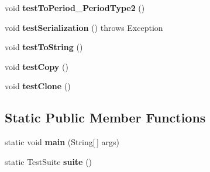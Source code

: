 \begin{DoxyCompactItemize}
\item 
\hypertarget{classorg_1_1joda_1_1time_1_1_test_mutable_interval___basics_a452c1665aa56bf78d9020b5d9f0861b3}{void {\bfseries test\-To\-Period\-\_\-\-Period\-Type2} ()}\label{classorg_1_1joda_1_1time_1_1_test_mutable_interval___basics_a452c1665aa56bf78d9020b5d9f0861b3}

\item 
\hypertarget{classorg_1_1joda_1_1time_1_1_test_mutable_interval___basics_a710d9afc2ab1d972f84e3218f547a4e1}{void {\bfseries test\-Serialization} ()  throws Exception }\label{classorg_1_1joda_1_1time_1_1_test_mutable_interval___basics_a710d9afc2ab1d972f84e3218f547a4e1}

\item 
\hypertarget{classorg_1_1joda_1_1time_1_1_test_mutable_interval___basics_a964c6453b0b5a346aacc5df8d1989b34}{void {\bfseries test\-To\-String} ()}\label{classorg_1_1joda_1_1time_1_1_test_mutable_interval___basics_a964c6453b0b5a346aacc5df8d1989b34}

\item 
\hypertarget{classorg_1_1joda_1_1time_1_1_test_mutable_interval___basics_a0a476464ae0b357c1b9e300a0fd1e9b2}{void {\bfseries test\-Copy} ()}\label{classorg_1_1joda_1_1time_1_1_test_mutable_interval___basics_a0a476464ae0b357c1b9e300a0fd1e9b2}

\item 
\hypertarget{classorg_1_1joda_1_1time_1_1_test_mutable_interval___basics_acea0000a3f517f9a161d01538fd06f9c}{void {\bfseries test\-Clone} ()}\label{classorg_1_1joda_1_1time_1_1_test_mutable_interval___basics_acea0000a3f517f9a161d01538fd06f9c}

\end{DoxyCompactItemize}
\subsection*{Static Public Member Functions}
\begin{DoxyCompactItemize}
\item 
\hypertarget{classorg_1_1joda_1_1time_1_1_test_mutable_interval___basics_ab45fc995a42a10a0bdd12ae81129f52f}{static void {\bfseries main} (String\mbox{[}$\,$\mbox{]} args)}\label{classorg_1_1joda_1_1time_1_1_test_mutable_interval___basics_ab45fc995a42a10a0bdd12ae81129f52f}

\item 
\hypertarget{classorg_1_1joda_1_1time_1_1_test_mutable_interval___basics_abdd680bee8a697a3ab019e6f1cc64f96}{static Test\-Suite {\bfseries suite} ()}\label{classorg_1_1joda_1_1time_1_1_test_mutable_interval___basics_abdd680bee8a697a3ab019e6f1cc64f96}

\end{DoxyCompactItemize}

